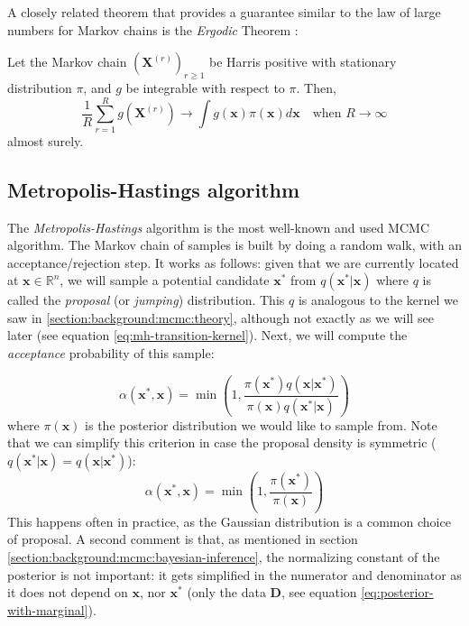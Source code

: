 \documentclass[12pt]{memoir}
\newcommand{\mb}{\mathbf}
\newcommand{\tb}{\textbf}
\newcommand{\ti}{\textit}
\begin{document}
A closely related theorem that provides a guarantee similar to the law of large numbers for Markov chains is the \ti{Ergodic} Theorem \cite{mcmc:slides:Rigon2024Mar}:

\begin{boxedthm}
    Let the Markov chain $(\mb X^{(r)})_{r\geq 1}$ be Harris positive with stationary distribution $\pi$, and $g$ be integrable with respect to $\pi$. Then,
    \begin{equation}
        \frac{1}{R}\sum_{r=1}^{R}g(\mb X^{(r)}) \rightarrow \int g(\mb x) \pi(\mb x) d \mb x \quad \text{when } R \rightarrow \infty
    \end{equation} 
    almost surely.
\end{boxedthm}

\subsection{Metropolis-Hastings algorithm}\label{section:Metropolis-Hastings}
The \ti{Metropolis-Hastings} algorithm is the most well-known and used MCMC algorithm. The Markov chain of samples is built by doing a random walk, with an acceptance/rejection step. It works as follows: given that we are currently located at $\mb x \in \mathbb{R}^n$, we will sample a potential candidate $\mb x^*$ from $q(\mb x^*|\mb x)$ where $q$ is called the \ti{proposal} (or \ti{jumping}) distribution. This $q$ is analogous to the kernel we saw in \ref{section:background:mcmc:theory}, although not exactly as we will see later (see equation \ref{eq:mh-transition-kernel}). Next, we will compute the \ti{acceptance} probability of this sample:

\begin{equation}
    \alpha(\mb x^*, \mb x) = \min\left(1, \frac{\pi(\mb x^*) q(\mb x|\mb x^*)}{\pi(\mb x) q(\mb x^*|\mb x)}\right)
\end{equation}
where $\pi(\mb x)$ is the posterior distribution we would like to sample from. Note that we can simplify this criterion in case the proposal density is symmetric ($q(\mb x^*|\mb x) = q(\mb x|\mb x^*)$):
\begin{equation}
    \alpha(\mb x^*, \mb x) = \min\left(1, \frac{\pi(\mb x^*)}{\pi(\mb x)}\right)
\end{equation}
This happens often in practice, as the Gaussian distribution is a common choice of proposal.
A second comment is that, as mentioned in section \ref{section:background:mcmc:bayesian-inference}, the normalizing constant of the posterior is not important: it gets simplified in the numerator and denominator as it does not depend on $\mb x$, nor $\mb x^*$ (only the data \tb D, see equation \ref{eq:posterior-with-marginal}). \medbreak
\end{document}
